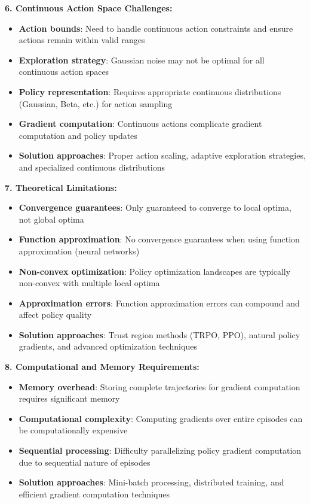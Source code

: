 \documentclass[12pt]{article}
\begin{document}
{{{\textbf{6. Continuous Action Space Challenges:}
\begin{itemize}
    \item \textbf{Action bounds}: Need to handle continuous action constraints and ensure actions remain within valid ranges
    \item \textbf{Exploration strategy}: Gaussian noise may not be optimal for all continuous action spaces
    \item \textbf{Policy representation}: Requires appropriate continuous distributions (Gaussian, Beta, etc.) for action sampling
    \item \textbf{Gradient computation}: Continuous actions complicate gradient computation and policy updates
    \item \textbf{Solution approaches}: Proper action scaling, adaptive exploration strategies, and specialized continuous distributions
\end{itemize}

\textbf{7. Theoretical Limitations:}
\begin{itemize}
    \item \textbf{Convergence guarantees}: Only guaranteed to converge to local optima, not global optima
    \item \textbf{Function approximation}: No convergence guarantees when using function approximation (neural networks)
    \item \textbf{Non-convex optimization}: Policy optimization landscapes are typically non-convex with multiple local optima
    \item \textbf{Approximation errors}: Function approximation errors can compound and affect policy quality
    \item \textbf{Solution approaches}: Trust region methods (TRPO, PPO), natural policy gradients, and advanced optimization techniques
\end{itemize}

\textbf{8. Computational and Memory Requirements:}
\begin{itemize}
    \item \textbf{Memory overhead}: Storing complete trajectories for gradient computation requires significant memory
    \item \textbf{Computational complexity}: Computing gradients over entire episodes can be computationally expensive
    \item \textbf{Sequential processing}: Difficulty parallelizing policy gradient computation due to sequential nature of episodes
    \item \textbf{Solution approaches}: Mini-batch processing, distributed training, and efficient gradient computation techniques
\end{itemize}

}}}
\end{document}
